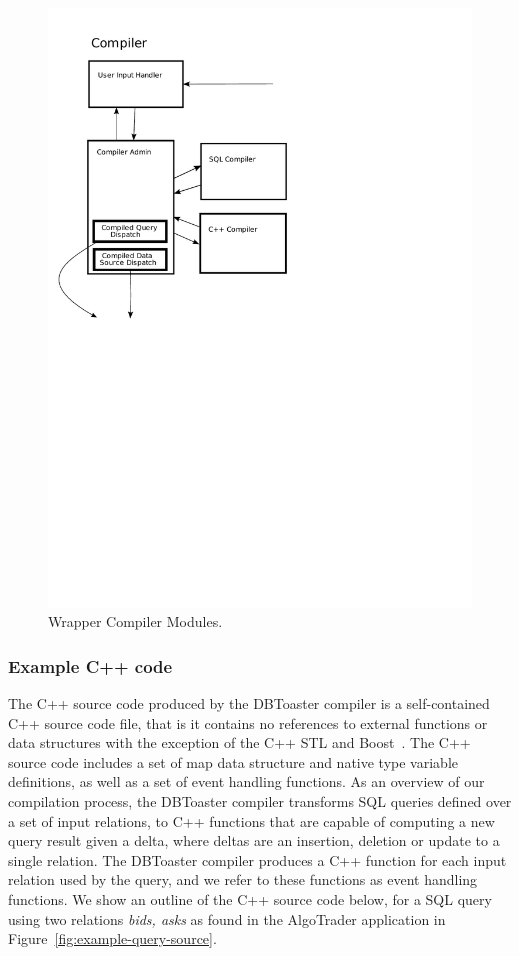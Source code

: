 \documentclass[14pt]{article}
\begin{document}
\begin{figure}
  \includegraphics[width=4.50in]{figures/compiler.pdf}
  \caption{Wrapper Compiler Modules.}
  \label{fig:wrapper-compiler}
\end{figure}

\subsubsection{Example C++ code}
The C++ source code produced by the DBToaster compiler is a self-contained C++
source code file, that is it contains no references to external functions or
data structures with the exception of the C++ STL and Boost~\cite{url-boost}.
The C++ source code includes a set of map data structure and native type
variable definitions, as well as a set of event handling functions. As an
overview of our compilation process, the DBToaster compiler transforms SQL
queries defined over a set of input relations, to C++ functions that are capable
of computing a new query result given a delta, where deltas are an insertion,
deletion or update to a single relation. The DBToaster compiler produces a C++
function for each input relation used by the query, and we refer to these
functions as event handling functions. We show an outline of the C++ source code
below, for a SQL query using two relations \textit{bids, asks} as found in the
AlgoTrader application in Figure~\ref{fig:example-query-source}.
\end{document}
